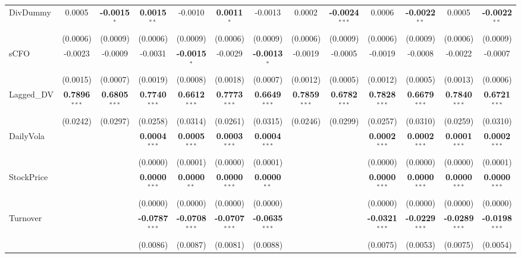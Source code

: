 \documentclass[11pt,a4paper]{article}
\begin{document}
\begin{table}[htbp]
\begin{tabular}{lcccccccccccc}
DivDummy & 0.0005 & \textbf{-0.0015}$^{*}$ & \textbf{0.0015}$^{**}$ & -0.0010 & \textbf{0.0011}$^{*}$ & -0.0013 & 0.0002 & \textbf{-0.0024}$^{***}$ & 0.0006 & \textbf{-0.0022}$^{**}$ & 0.0005 & \textbf{-0.0022}$^{**}$ \\
 & (0.0006) & (0.0009) & (0.0006) & (0.0009) & (0.0006) & (0.0009) & (0.0006) & (0.0009) & (0.0006) & (0.0009) & (0.0006) & (0.0009) \\
sCFO & -0.0023 & -0.0009 & -0.0031 & \textbf{-0.0015}$^{*}$ & -0.0029 & \textbf{-0.0013}$^{*}$ & -0.0019 & -0.0005 & -0.0019 & -0.0008 & -0.0022 & -0.0007 \\
 & (0.0015) & (0.0007) & (0.0019) & (0.0008) & (0.0018) & (0.0007) & (0.0012) & (0.0005) & (0.0012) & (0.0005) & (0.0013) & (0.0006) \\
Lagged\_DV & \textbf{0.7896}$^{***}$ & \textbf{0.6805}$^{***}$ & \textbf{0.7740}$^{***}$ & \textbf{0.6612}$^{***}$ & \textbf{0.7773}$^{***}$ & \textbf{0.6649}$^{***}$ & \textbf{0.7859}$^{***}$ & \textbf{0.6782}$^{***}$ & \textbf{0.7828}$^{***}$ & \textbf{0.6679}$^{***}$ & \textbf{0.7840}$^{***}$ & \textbf{0.6721}$^{***}$ \\
 & (0.0242) & (0.0297) & (0.0258) & (0.0314) & (0.0261) & (0.0315) & (0.0246) & (0.0299) & (0.0257) & (0.0310) & (0.0259) & (0.0310) \\
DailyVola &  &  & \textbf{0.0004}$^{***}$ & \textbf{0.0005}$^{***}$ & \textbf{0.0003}$^{***}$ & \textbf{0.0004}$^{***}$ &  &  & \textbf{0.0002}$^{***}$ & \textbf{0.0002}$^{***}$ & \textbf{0.0001}$^{***}$ & \textbf{0.0002}$^{***}$ \\
 &  &  & (0.0000) & (0.0001) & (0.0000) & (0.0001) &  &  & (0.0000) & (0.0000) & (0.0000) & (0.0001) \\
StockPrice &  &  & \textbf{0.0000}$^{***}$ & \textbf{0.0000}$^{**}$ & \textbf{0.0000}$^{***}$ & \textbf{0.0000}$^{**}$ &  &  & \textbf{0.0000}$^{***}$ & \textbf{0.0000}$^{***}$ & \textbf{0.0000}$^{***}$ & \textbf{0.0000}$^{***}$ \\
 &  &  & (0.0000) & (0.0000) & (0.0000) & (0.0000) &  &  & (0.0000) & (0.0000) & (0.0000) & (0.0000) \\
Turnover &  &  & \textbf{-0.0787}$^{***}$ & \textbf{-0.0708}$^{***}$ & \textbf{-0.0707}$^{***}$ & \textbf{-0.0635}$^{***}$ &  &  & \textbf{-0.0321}$^{***}$ & \textbf{-0.0229}$^{***}$ & \textbf{-0.0289}$^{***}$ & \textbf{-0.0198}$^{***}$ \\
 &  &  & (0.0086) & (0.0087) & (0.0081) & (0.0088) &  &  & (0.0075) & (0.0053) & (0.0075) & (0.0054) \\

\end{tabular}
\end{table}
\end{document}
